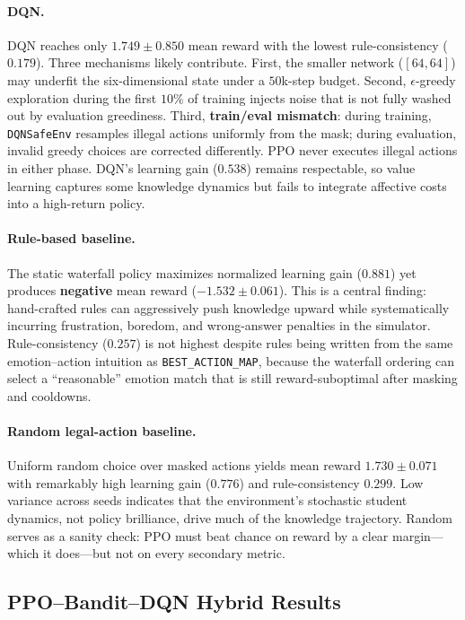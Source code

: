 \paragraph{DQN.} DQN reaches only $1.749 \pm 0.850$ mean reward with the lowest rule-consistency ($0.179$). Three mechanisms likely contribute. First, the smaller network ($[64,64]$) may underfit the six-dimensional state under a $50$k-step budget. Second, $\epsilon$-greedy exploration during the first $10\%$ of training injects noise that is not fully washed out by evaluation greediness. Third, \textbf{train/eval mismatch}: during training, \texttt{DQNSafeEnv} resamples illegal actions uniformly from the mask; during evaluation, invalid greedy choices are corrected differently. PPO never executes illegal actions in either phase. DQN's learning gain ($0.538$) remains respectable, so value learning captures some knowledge dynamics but fails to integrate affective costs into a high-return policy.

\paragraph{Rule-based baseline.} The static waterfall policy maximizes normalized learning gain ($0.881$) yet produces \textbf{negative} mean reward ($-1.532 \pm 0.061$). This is a central finding: hand-crafted rules can aggressively push knowledge upward while systematically incurring frustration, boredom, and wrong-answer penalties in the simulator. Rule-consistency ($0.257$) is not highest despite rules being written from the same emotion--action intuition as \texttt{BEST\_ACTION\_MAP}, because the waterfall ordering can select a ``reasonable'' emotion match that is still reward-suboptimal after masking and cooldowns.

\paragraph{Random legal-action baseline.} Uniform random choice over masked actions yields mean reward $1.730 \pm 0.071$ with remarkably high learning gain ($0.776$) and rule-consistency $0.299$. Low variance across seeds indicates that the environment's stochastic student dynamics, not policy brilliance, drive much of the knowledge trajectory. Random serves as a sanity check: PPO must beat chance on reward by a clear margin---which it does---but not on every secondary metric.

\subsection{PPO--Bandit--DQN Hybrid Results}\label{sec:results_adapt_hybrid}

